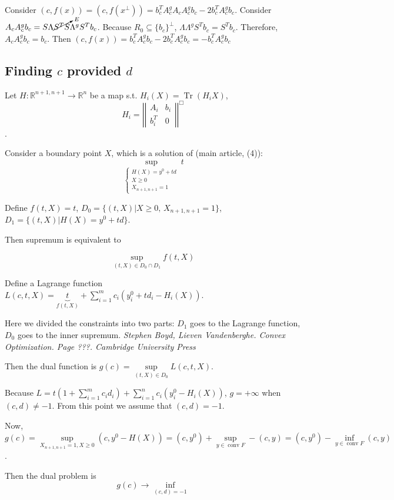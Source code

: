 \documentclass[a4paper]{article}
\DeclareMathOperator{\Tr}{Tr}
\DeclareMathOperator{\conv}{conv}
\begin{document}

Consider $(c,f(x))=(c,f(x^\bot))=b_c^TA_c^gA_cA_c^gb_c-2b_c^TA_c^gb_c$. Consider $A_cA_c^gb_c=S\Lambda \cancelto{E}{S^TS}\Lambda^gS^Tb_c$. Because $R_0\subseteq\{b_c\}^\bot$, $\Lambda\Lambda^gS^Tb_c=S^Tb_c$. Therefore, $A_cA_c^gb_c=b_c$. Then $(c,f(x))=b_c^TA_c^gb_c-2b_c^TA_c^gb_c=\boxed{-b_c^TA_c^gb_c}$

\subsection{Finding $c$ provided $d$}
Let $H\colon \mathbb{R}^{n+1, n+1}\to \mathbb{R}^n$ be a map s.t. $H_i(X)=\Tr(H_iX)$, $$H_i=\left|\left|
\begin{array}{cc}
A_i & b_i\\
b_i^T & 0
\end{array}
\right|\right|^{\Box}$$.

Consider a boundary point $X$, which is a solution of (main article, (4)):
$$\boxed{\sup\limits_{\begin{cases}
H(X)=y^0+td\\
X\geqslant 0\\
X_{n+1,n+1}=1
	\end{cases}} t}$$

Define $f(t,X)=t$, $D_0=\{(t,X)\big| X\geqslant 0,\, X_{n+1,n+1}=1 \}$, $D_1=\{(t,X)\big| H(X)=y^0+td\}$.

Then supremum is equivalent to

$$\sup\limits_{(t,X)\in D_0\cap D_1}f(t,X)$$

Define a Lagrange function $L(c,t,X)=\underbrace{t}_{f(t,X)}+\sum\limits_{i=1}^m c_i(y^0_i+td_i-H_i(X))$.

Here we divided the constraints into two parts: $D_1$ goes to the Lagrange function, $D_0$ goes to the inner supremum. {\em Stephen Boyd, Lieven Vandenberghe. Convex Optimization. Page ???. Cambridge University Press}

Then the dual function is $g(c)=\sup\limits_{(t,X)\in D_0} L(c,t,X)$.

Because $L=t(1+\sum\limits_{i=1}^m c_id_i)+\sum\limits_{i=1}^n c_i(y^0_i-H_i(X))$, $g=+\infty$ when $(c,d)\neq -1$. From this point we assume that $\boxed{(c,d)=-1}$.

Now, $g(c)=\sup\limits_{X_{n+1,n+1}=1,X\geqslant 0} (c,y^0-H(X))=(c,y^0)+\sup\limits_{y\in\conv F} -(c,y)=(c,y^0)-\inf\limits_{y\in\conv F} (c,y)$.

Then the dual problem is
$$g(c)\to\inf\limits_{(c,d)=-1}$$
\end{document}
